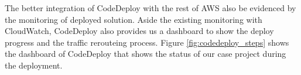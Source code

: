 \par
The better integration of CodeDeploy with the rest of AWS also be evidenced by the monitoring of deployed solution. Aside the existing monitoring with CloudWatch, CodeDeploy also provides us a dashboard to show the deploy progress and the traffic rerouteing process. Figure \ref{fig:codedeploy_steps} shows the dashboard of CodeDeploy that shows the status of our case project during the deployment.

